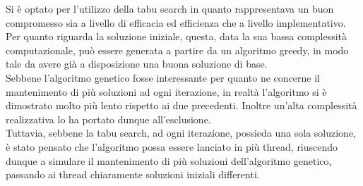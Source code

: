 
\noindent Si è optato per l'utilizzo della tabu search in quanto rappresentava un buon compromesso sia a livello
di efficacia ed efficienza che a livello implementativo. Per quanto riguarda la soluzione iniziale,
questa, data la sua bassa complessità computazionale, può essere generata a partire da un algoritmo greedy,
in modo tale da avere già a disposizione una buona soluzione di base.\\
Sebbene l'algoritmo genetico fosse interessante per quanto ne concerne il mantenimento di più soluzioni ad ogni iterazione, in realtà l'algoritmo si è dimostrato
molto più lento rispetto ai due precedenti. Inoltre un'alta complessità realizzativa lo ha portato dunque all'esclusione.\\
Tuttavia, sebbene la tabu search, ad ogni iterazione, possieda una sola soluzione, è stato pensato che l'algoritmo possa essere lanciato in più thread,
riuscendo dunque a simulare il mantenimento di più soluzioni dell'algoritmo genetico, passando ai thread chiaramente soluzioni iniziali differenti.
